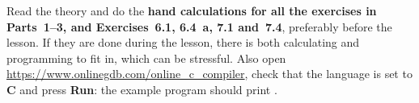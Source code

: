 \begin{aside}
\note[Preparation] Read the theory and do the \textbf{hand calculations for all the exercises in
Parts~1--3, and Exercises~6.1, 6.4~a, 7.1 and~7.4}, preferably before the lesson. If they are done during
the lesson, there is both calculating and programming to fit in, which can be stressful. Also open
\url{https://www.onlinegdb.com/online_c_compiler}, check that the language is set to \textbf{C}
and press \textbf{Run}: the example program should print .
\end{aside}




